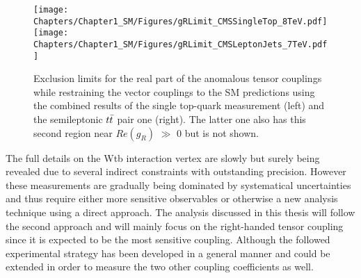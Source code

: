 \begin{figure}[h!t]
 \centering
 \texttt{[image: Chapters/Chapter1\_SM/Figures/gRLimit\_CMSSingleTop\_8TeV.pdf]}
 \texttt{[image: Chapters/Chapter1\_SM/Figures/gRLimit\_CMSLeptonJets\_7TeV.pdf]}
 \caption{Exclusion limits for the real part of the anomalous tensor couplings while restraining the vector couplings to the SM predictions using the combined results of the single top-quark measurement (left) and the semileptonic $t\bar{t}$ pair one (right). The latter one also has this second region near $Re(g_R)$ $\gg$ $0$ but is not shown.} \label{fig::WtbResults}
\end{figure}

The full details on the Wtb interaction vertex are slowly but surely being revealed due to several indirect constraints with outstanding precision. However these measurements are gradually being dominated by systematical uncertainties and thus require either more sensitive observables or otherwise a new analysis technique using a direct approach.
The analysis discussed in this thesis will follow the second approach and will mainly focus on the right-handed tensor coupling since it is expected to be the most sensitive coupling. Although the followed experimental strategy has been developed in a general manner and could be extended in order to measure the two other coupling coefficients as well.